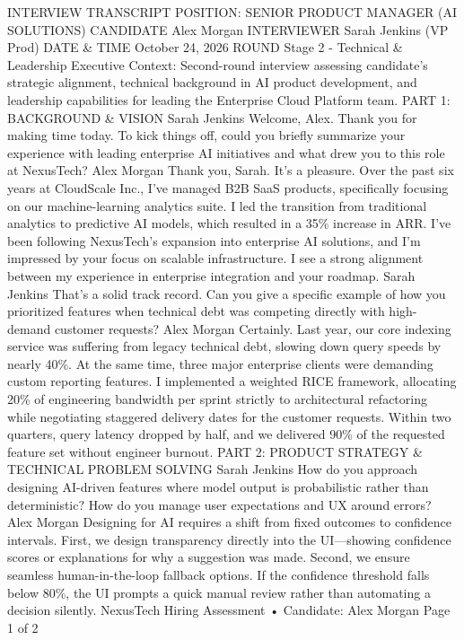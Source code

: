 \documentclass[12pt]{article}
\begin{document}
INTERVIEW TRANSCRIPT
POSITION: SENIOR PRODUCT MANAGER (AI SOLUTIONS)
CANDIDATE
Alex Morgan
INTERVIEWER
Sarah Jenkins (VP Prod)
DATE \& TIME
October 24, 2026
ROUND
Stage 2 - Technical \&
Leadership
Executive Context: Second-round interview assessing candidate's strategic alignment, technical background in
AI product development, and leadership capabilities for leading the Enterprise Cloud Platform team.
PART 1: BACKGROUND \& VISION
Sarah Jenkins
Welcome, Alex. Thank you for making time today. To kick things off, could you briefly summarize your experience
with leading enterprise AI initiatives and what drew you to this role at NexusTech?
Alex Morgan
Thank you, Sarah. It’s a pleasure. Over the past six years at CloudScale Inc., I’ve managed B2B SaaS products,
specifically focusing on our machine-learning analytics suite. I led the transition from traditional analytics to
predictive AI models, which resulted in a 35\% increase in ARR. I’ve been following NexusTech’s expansion into
enterprise AI solutions, and I’m impressed by your focus on scalable infrastructure. I see a strong alignment between
my experience in enterprise integration and your roadmap.
Sarah Jenkins
That’s a solid track record. Can you give a specific example of how you prioritized features when technical debt was
competing directly with high-demand customer requests?
Alex Morgan
Certainly. Last year, our core indexing service was suffering from legacy technical debt, slowing down query speeds
by nearly 40\%. At the same time, three major enterprise clients were demanding custom reporting features. I
implemented a weighted RICE framework, allocating 20\% of engineering bandwidth per sprint strictly to architectural
refactoring while negotiating staggered delivery dates for the customer requests. Within two quarters, query latency
dropped by half, and we delivered 90\% of the requested feature set without engineer burnout.
PART 2: PRODUCT STRATEGY \& TECHNICAL PROBLEM SOLVING
Sarah Jenkins
How do you approach designing AI-driven features where model output is probabilistic rather than deterministic?
How do you manage user expectations and UX around errors?
Alex Morgan
Designing for AI requires a shift from fixed outcomes to confidence intervals. First, we design transparency directly
into the UI—showing confidence scores or explanations for why a suggestion was made. Second, we ensure
seamless human-in-the-loop fallback options. If the confidence threshold falls below 80\%, the UI prompts a quick
manual review rather than automating a decision silently.
NexusTech Hiring Assessment • Candidate: Alex Morgan
Page 1 of 2
\end{document}
